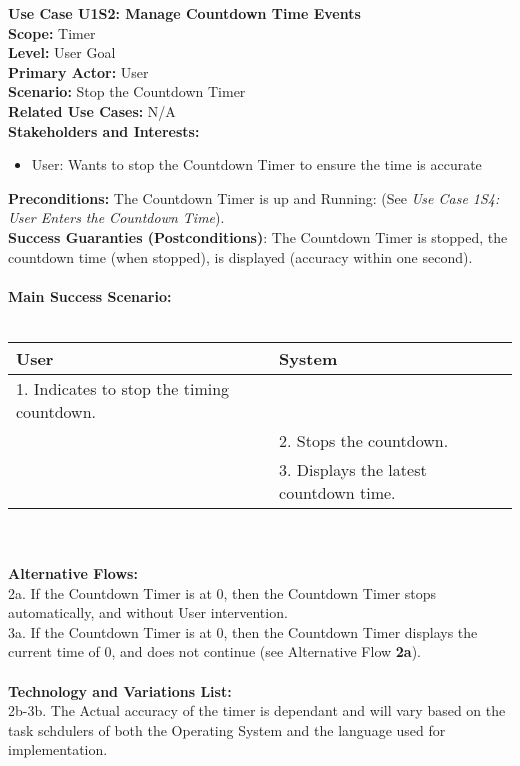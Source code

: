 \documentclass[letterpaper]{article}
\begin{document}
\noindent
\textbf{Use Case U1S2:  Manage Countdown Time Events}\\
\textbf{Scope:  }Timer\\
\textbf{Level:  }User Goal\\
\textbf{Primary Actor:  }User\\
\textbf{Scenario:  }Stop the Countdown Timer\\
\textbf{Related Use Cases:  }N/A\\
\textbf{Stakeholders and Interests:}
\begin{itemize}
\item User:  Wants to stop the Countdown Timer to ensure the time is
accurate
\end{itemize}
\textbf{Preconditions:  }The Countdown Timer is up and Running:  (See
\textit{Use Case 1S4:  User Enters the Countdown Time}).\\
\textbf{Success Guaranties  (Postconditions)}: 
The Countdown Timer is stopped, the countdown time (when stopped),
is displayed (accuracy within one second).\\\\
\textbf{Main Success Scenario: }\\\\
\begin{tabular}{|p{6cm}|p{6cm}|}\hline
\textbf{User} & \textbf{System}\\\hline
1.  Indicates to stop the timing countdown. & \\\hline
&2.  Stops the countdown.\\\hline
&3.  Displays the latest countdown time.\\\hline
\end{tabular}\\\\
\textbf{Alternative Flows:  }\\
2a. If the Countdown Timer is at 0, then the Countdown Timer stops
automatically, and without User intervention.\\
3a. If the Countdown Timer is at 0, then the Countdown Timer displays
the current time of 0, and does not continue (see Alternative Flow
\textbf{2a}).\\\\
\textbf{Technology and Variations List:  }\\
2b-3b.  The Actual accuracy of the timer is dependant and
will vary based on the task schdulers of both the Operating
System and the language used for implementation.\\\\
\end{document}

